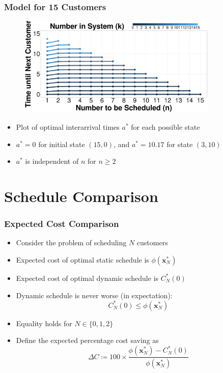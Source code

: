 \documentclass{beamer}
\begin{document}
\begin{frame}
	\frametitle{Model for 15 Customers}

	\begin{figure}
		\centering
		\includegraphics[width=0.85\textwidth]{Dynamic_Line_Interarrival_k.eps}
	\end{figure}

	\begin{itemize}
		\item Plot of optimal interarrival times $a^{*}$ for each possible state
		\item $a^{*} = 0$ for initial state $(15, 0)$, and $a^{*} = 10.17$ for state $(3, 10)$
		\item $a^{*}$ is independent of $n$ for $n \geq 2$
	\end{itemize}
\end{frame}

\section{Schedule Comparison}

\begin{frame}
	\frametitle{Expected Cost Comparison}

	\begin{itemize}
		\item Consider the problem of scheduling $N$ customers
		\item Expected cost of optimal static schedule is $\phi (\mathbf{x}_{N}^{*})$
		\item Expected cost of optimal dynamic schedule is $C_{N}^{*} (0)$
		\item Dynamic schedule is never worse (in expectation):
		\begin{equation*}
			C_{N}^{*} (0) \leq \phi (\mathbf{x}_{N}^{*})
		\end{equation*}
		\item Equality holds for $N \in \{ 0, 1, 2 \}$
		\item Define the \alert{expected percentage cost saving} as
		\begin{equation*}
			\Delta C \coloneqq 100 \times \frac{\phi (\mathbf{x}_{N}^{*}) - C_{N}^{*} (0)}{\phi (\mathbf{x}_{N}^{*})}
		\end{equation*}
	\end{itemize}
\end{frame}
\end{document}

